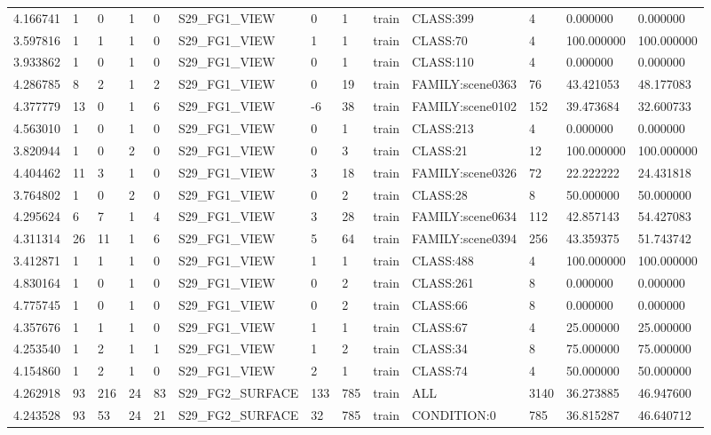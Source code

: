 \begin{tabular}{lllllllllllll}
4.166741 & 1 & 0 & 1 & 0 & S29\_FG1\_VIEW & 0 & 1 & train & CLASS:399 & 4 & 0.000000 & 0.000000 \\
3.597816 & 1 & 1 & 1 & 0 & S29\_FG1\_VIEW & 1 & 1 & train & CLASS:70 & 4 & 100.000000 & 100.000000 \\
3.933862 & 1 & 0 & 1 & 0 & S29\_FG1\_VIEW & 0 & 1 & train & CLASS:110 & 4 & 0.000000 & 0.000000 \\
4.286785 & 8 & 2 & 1 & 2 & S29\_FG1\_VIEW & 0 & 19 & train & FAMILY:scene0363 & 76 & 43.421053 & 48.177083 \\
4.377779 & 13 & 0 & 1 & 6 & S29\_FG1\_VIEW & -6 & 38 & train & FAMILY:scene0102 & 152 & 39.473684 & 32.600733 \\
4.563010 & 1 & 0 & 1 & 0 & S29\_FG1\_VIEW & 0 & 1 & train & CLASS:213 & 4 & 0.000000 & 0.000000 \\
3.820944 & 1 & 0 & 2 & 0 & S29\_FG1\_VIEW & 0 & 3 & train & CLASS:21 & 12 & 100.000000 & 100.000000 \\
4.404462 & 11 & 3 & 1 & 0 & S29\_FG1\_VIEW & 3 & 18 & train & FAMILY:scene0326 & 72 & 22.222222 & 24.431818 \\
3.764802 & 1 & 0 & 2 & 0 & S29\_FG1\_VIEW & 0 & 2 & train & CLASS:28 & 8 & 50.000000 & 50.000000 \\
4.295624 & 6 & 7 & 1 & 4 & S29\_FG1\_VIEW & 3 & 28 & train & FAMILY:scene0634 & 112 & 42.857143 & 54.427083 \\
4.311314 & 26 & 11 & 1 & 6 & S29\_FG1\_VIEW & 5 & 64 & train & FAMILY:scene0394 & 256 & 43.359375 & 51.743742 \\
3.412871 & 1 & 1 & 1 & 0 & S29\_FG1\_VIEW & 1 & 1 & train & CLASS:488 & 4 & 100.000000 & 100.000000 \\
4.830164 & 1 & 0 & 1 & 0 & S29\_FG1\_VIEW & 0 & 2 & train & CLASS:261 & 8 & 0.000000 & 0.000000 \\
4.775745 & 1 & 0 & 1 & 0 & S29\_FG1\_VIEW & 0 & 2 & train & CLASS:66 & 8 & 0.000000 & 0.000000 \\
4.357676 & 1 & 1 & 1 & 0 & S29\_FG1\_VIEW & 1 & 1 & train & CLASS:67 & 4 & 25.000000 & 25.000000 \\
4.253540 & 1 & 2 & 1 & 1 & S29\_FG1\_VIEW & 1 & 2 & train & CLASS:34 & 8 & 75.000000 & 75.000000 \\
4.154860 & 1 & 2 & 1 & 0 & S29\_FG1\_VIEW & 2 & 1 & train & CLASS:74 & 4 & 50.000000 & 50.000000 \\
4.262918 & 93 & 216 & 24 & 83 & S29\_FG2\_SURFACE & 133 & 785 & train & ALL & 3140 & 36.273885 & 46.947600 \\
4.243528 & 93 & 53 & 24 & 21 & S29\_FG2\_SURFACE & 32 & 785 & train & CONDITION:0 & 785 & 36.815287 & 46.640712 \\

\end{tabular}
